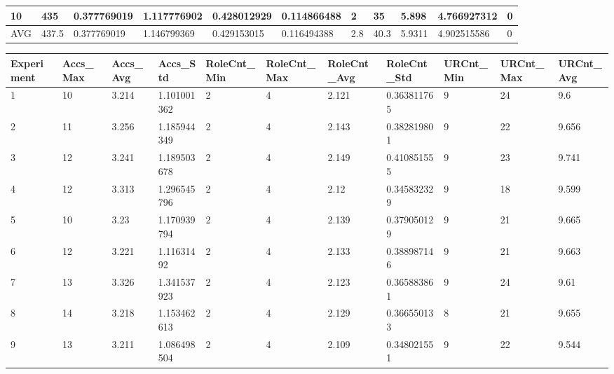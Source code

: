 \begin{table}[H]
\begin{adjustbox}{max width=380pt,keepaspectratio,angle=90}
\begin{tabular}{|l|l|l|l|l|l|l|l|l|l|l|}
						10         & 435   & 0.377769019  & 1.117776902  & 0.428012929  & 0.114866488  & 2         & 35        & 5.898     & 4.766927312 & 0         \\ \hline\hline
						AVG        & 437.5 & 0.377769019  & 1.146799369  & 0.429153015  & 0.116494388  & 2.8       & 40.3      & 5.9311    & 4.902515586 & 0         \\ \hline
					\end{tabular}
				\end{adjustbox}
				\begin{adjustbox}{max width=380pt,keepaspectratio,angle=90}
					\begin{tabular}{|l|l|l|l|l|l|l|l|l|l|l|}
						\rowcolor[HTML]{EFEFEF} 
						\hline
						Experiment & Accs\_Max & Accs\_Avg & Accs\_Std   & RoleCnt\_Min & RoleCnt\_Max & RoleCnt\_Avg & RoleCnt\_Std & URCnt\_Min & URCnt\_Max & URCnt\_Avg \\ \hline
						1          & 10        & 3.214     & 1.101001362 & 2            & 4            & 2.121        & 0.363811765  & 9          & 24         & 9.6        \\ \hline
						2          & 11        & 3.256     & 1.185944349 & 2            & 4            & 2.143        & 0.382819801  & 9          & 22         & 9.656      \\ \hline
						3          & 12        & 3.241     & 1.189503678 & 2            & 4            & 2.149        & 0.410851555  & 9          & 23         & 9.741      \\ \hline
						4          & 12        & 3.313     & 1.296545796 & 2            & 4            & 2.12         & 0.345832329  & 9          & 18         & 9.599      \\ \hline
						5          & 10        & 3.23      & 1.170939794 & 2            & 4            & 2.139        & 0.379050129  & 9          & 21         & 9.665      \\ \hline
						6          & 12        & 3.221     & 1.11631492  & 2            & 4            & 2.133        & 0.388987146  & 9          & 21         & 9.663      \\ \hline
						7          & 13        & 3.326     & 1.341537923 & 2            & 4            & 2.123        & 0.365883861  & 9          & 24         & 9.61       \\ \hline
						8          & 14        & 3.218     & 1.153462613 & 2            & 4            & 2.129        & 0.366550133  & 8          & 21         & 9.655      \\ \hline
						9          & 13        & 3.211     & 1.086498504 & 2            & 4            & 2.109        & 0.348021551  & 9          & 22         & 9.544      \\ \hline

\end{tabular}
\end{adjustbox}
\end{table}
